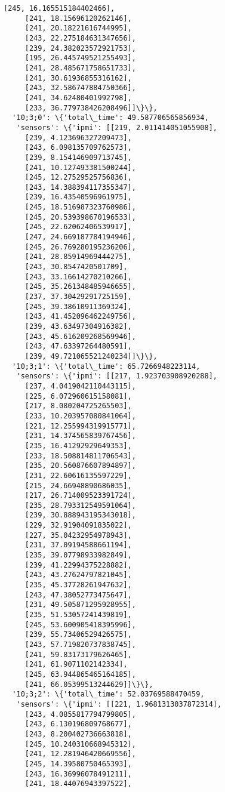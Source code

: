 \documentclass[11pt]{article}
\begin{document}
\begin{tcolorbox}[breakable, size=fbox, boxrule=.5pt, pad at break*=1mm, opacityfill=0]
\begin{Verbatim}[commandchars=\\\{\}]
     [245, 16.165515184402466],
     [241, 18.15696120262146],
     [241, 20.18221616744995],
     [243, 22.275184631347656],
     [239, 24.382023572921753],
     [195, 26.445749521255493],
     [241, 28.485671758651733],
     [241, 30.61936855316162],
     [243, 32.586747884750366],
     [241, 34.62480401992798],
     [233, 36.779738426208496]]\}\},
  '10;3;0': \{'total\_time': 49.587706565856934,
   'sensors': \{'ipmi': [[219, 2.011414051055908],
     [239, 4.123696327209473],
     [243, 6.098135709762573],
     [239, 8.154146909713745],
     [241, 10.127493381500244],
     [245, 12.27529525756836],
     [243, 14.388394117355347],
     [239, 16.43540596961975],
     [245, 18.516987323760986],
     [245, 20.539398670196533],
     [245, 22.62062406539917],
     [247, 24.669187784194946],
     [245, 26.769280195236206],
     [241, 28.85914969444275],
     [243, 30.8547420501709],
     [243, 33.16614270210266],
     [245, 35.261348485946655],
     [237, 37.30429291725159],
     [245, 39.38610911369324],
     [243, 41.452096462249756],
     [239, 43.63497304916382],
     [243, 45.616209268569946],
     [243, 47.63397264480591],
     [239, 49.721065521240234]]\}\},
  '10;3;1': \{'total\_time': 65.7266948223114,
   'sensors': \{'ipmi': [[217, 1.923703908920288],
     [237, 4.0419042110443115],
     [225, 6.072960615158081],
     [217, 8.080204725265503],
     [233, 10.203957080841064],
     [221, 12.255994319915771],
     [231, 14.374565839767456],
     [235, 16.41292929649353],
     [233, 18.508814811706543],
     [235, 20.560876607894897],
     [231, 22.60616135597229],
     [215, 24.66948890686035],
     [217, 26.714009523391724],
     [235, 28.793312549591064],
     [239, 30.888943195343018],
     [229, 32.91904091835022],
     [227, 35.04232954978943],
     [231, 37.09194588661194],
     [235, 39.07798933982849],
     [239, 41.22994375228882],
     [243, 43.27624797821045],
     [235, 45.37728261947632],
     [243, 47.38052773475647],
     [231, 49.505871295928955],
     [235, 51.53057241439819],
     [245, 53.600905418395996],
     [239, 55.73406529426575],
     [243, 57.719820737838745],
     [241, 59.83173179626465],
     [241, 61.9071102142334],
     [245, 63.944865465164185],
     [241, 66.05399513244629]]\}\},
  '10;3;2': \{'total\_time': 52.03769588470459,
   'sensors': \{'ipmi': [[221, 1.9681313037872314],
     [243, 4.0855817794799805],
     [243, 6.130196809768677],
     [243, 8.200402736663818],
     [245, 10.240310668945312],
     [241, 12.281946420669556],
     [245, 14.39580750465393],
     [243, 16.36996078491211],
     [241, 18.44076943397522],

\end{Verbatim}
\end{tcolorbox}
\end{document}
